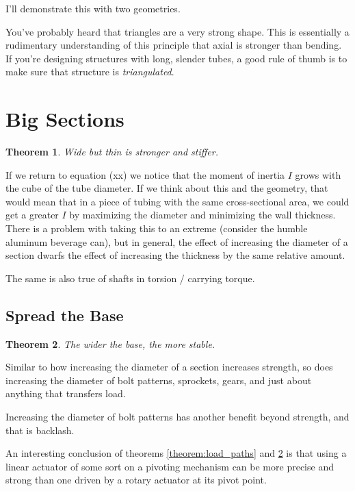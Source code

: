 \documentclass[10pt,letterpaper]{book}
\newtheorem{theorem}{Theorem}
\begin{document}
I'll demonstrate this with two geometries.

You've probably heard that triangles are a very strong shape. This is essentially a rudimentary understanding of this principle that axial is stronger than bending. If you're designing structures with long, slender tubes, a good rule of thumb is to make sure that structure is \textit{triangulated}.

\section{Big Sections}
\begin{theorem} \label{theorem:big_sections}
Wide but thin is stronger and stiffer.
\end{theorem}

If we return to equation (xx) we notice that the moment of inertia $I$ grows with the cube of the tube diameter. If we think about this and the geometry, that would mean that in a piece of tubing with the same cross-sectional area, we could get a greater $I$ by maximizing the diameter and minimizing the wall thickness. There is a problem with taking this to an extreme (consider the humble aluminum beverage can), but in general, the effect of increasing the diameter of a section dwarfs the effect of increasing the thickness by the same relative amount.

The same is also true of shafts in torsion / carrying torque.

\subsection{Spread the Base}

\begin{theorem} \label{theorem:spread_base}
The wider the base, the more stable.
\end{theorem}

Similar to how increasing the diameter of a section increases strength, so does increasing the diameter of bolt patterns, sprockets, gears, and just about anything that transfers load.

Increasing the diameter of bolt patterns has another benefit beyond strength, and that is backlash.


An interesting conclusion of theorems \ref{theorem:load_paths} and \ref{theorem:spread_base} is that using a linear actuator of some sort on a pivoting mechanism can be more precise and strong than one driven by a rotary actuator at its pivot point.
\end{document}
